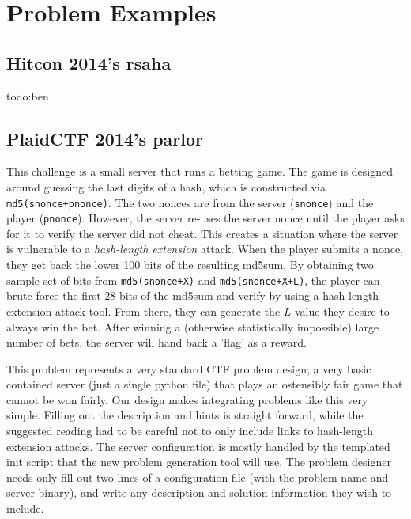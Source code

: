 \section{Problem Examples}
\subsection{Hitcon 2014's rsaha}
todo:ben
\subsection{PlaidCTF 2014's parlor}
This challenge is a small server that runs a betting game. The game is
designed around guessing the last digits of a hash, which is
constructed via \texttt{md5(snonce+pnonce)}. The two nonces are from
the server (\texttt{snonce}) and the player
(\texttt{pnonce}). However, the server re-uses the server nonce until
the player asks for it to verify the server did not cheat. This
creates a situation where the server is vulnerable to a
\textit{hash-length extension} attack. When the player submits a
nonce, they get back the lower 100 bits of the resulting md5sum. By
obtaining two sample set of bits from \texttt{md5(snonce+X)} and
\texttt{md5(snonce+X+L)}, the player can brute-force the first 28 bits
of the md5sum and verify by using a hash-length extension attack
tool. From there, they can generate the $L$ value they desire to
always win the bet. After winning a (otherwise statistically
impossible) large number of bets, the server will hand back a 'flag'
as a reward.

This problem represents a very standard CTF problem design; a very
basic contained server (just a single python file) that plays an
ostensibly fair game that cannot be won fairly. Our design makes
integrating problems like this very simple. Filling out the
description and hints is straight forward, while the suggested reading
had to be careful not to only include links to hash-length extension
attacks. The server configuration is mostly handled by the templated
init script that the new problem generation tool will use. The problem
designer needs only fill out two lines of a configuration file (with
the problem name and server binary), and write any description and
solution information they wish to include.
